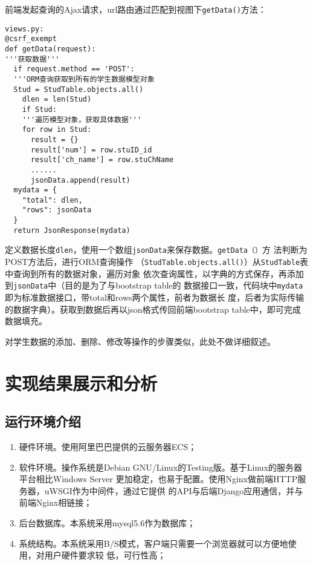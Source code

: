 \documentclass{ede}
\begin{document}
前端发起查询的Ajax\cite{Liu2017Testing}请求，url路由通过匹配到视图下\texttt{getData()}方法：

\begin{verbatim}
views.py:
@csrf_exempt
def getData(request):
'''获取数据'''
  if request.method == 'POST':
  '''ORM查询获取到所有的学生数据模型对象  
  Stud = StudTable.objects.all()
    dlen = len(Stud) 
    if Stud:
    '''遍历模型对象，获取具体数据'''
    for row in Stud:
      result = {}
      result['num'] = row.stuID_id 
      result['ch_name'] = row.stuChName
      ......
      jsonData.append(result)
  mydata = {
    "total": dlen,
    "rows": jsonData
  }
  return JsonResponse(mydata)
\end{verbatim}

定义数据长度\texttt{dlen}，使用一个数组\texttt{jsonData}来保存数据。\texttt{getData（）}方
法判断为POST方法后，进行ORM查询操作
（\texttt{StudTable.objects.all()}）从\texttt{StudTable}表中查询到所有的数据对象，遍历对象
依次查询属性，以字典的方式保存，再添加到\texttt{jsonData}中（目的是为了与bootstrap table的
数据接口一致，代码块中\texttt{mydata}即为标准数据接口，带total和rows两个属性，前者为数据长
度，后者为实际传输的数据字典）。获取到数据后再以json格式传回前端bootstrap table中，即可完成
数据填充。

对学生数据的添加、删除、修改等操作的步骤类似，此处不做详细叙述。

\section{实现结果展示和分析}

\subsection{运行环境介绍}

\begin{enumerate}
\item 硬件环境。使用阿里巴巴提供的云服务器ECS；
\item 软件环境。操作系统是Debian GNU/Linux的Testing版。基于Linux的服务器平台相比Windows
  Server 更加稳定，也易于配置。使用Nginx做前端HTTP服务器，uWSGI作为中间件，通过它提供
  的API与后端Django应用通信，并与前端Nginx相链接；
\item 后台数据库。本系统采用mysql5.6作为数据库；
\item 系统结构。本系统采用B/S模式，客户端只需要一个浏览器就可以方便地使用，对用户硬件要求较
  低，可行性高；
\end{enumerate}
\end{document}
